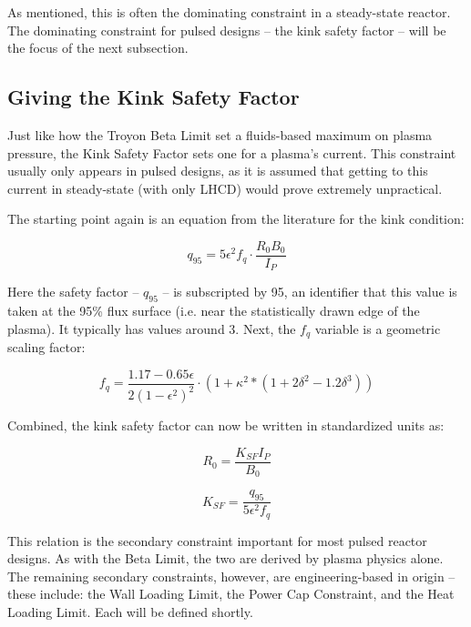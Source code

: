 \documentclass[11pt]{book}
\begin{document}
As mentioned, this is often the dominating constraint in a steady-state reactor. The dominating constraint for pulsed designs -- the kink safety factor -- will be the focus of the next subsection.

\subsection{Giving the Kink Safety Factor}

Just like how the Troyon Beta Limit set a fluids-based maximum on plasma pressure, the Kink Safety Factor sets one for a plasma's current. This constraint usually only appears in pulsed designs, as it is assumed that getting to this current in steady-state (with only LHCD) would prove extremely unpractical.

The starting point again is an equation from the literature for the kink condition:

\begin{equation}
	q_{95} = 5 \epsilon^2 f_q \cdot  \frac{ R_0 B_0 }{ I_P }
\end{equation}

Here the safety factor -- $q_{95}$ -- is subscripted by 95, an identifier that this value is taken at the 95\% flux surface (i.e. near the statistically drawn edge of the plasma). It typically has values around 3. Next, the $f_q$ variable is a geometric scaling factor:

\begin{equation}
  f_q = \frac{1.17 - 0.65 \epsilon}{2 ( 1 - \epsilon^2 )^2} \cdot  \left( 1 + \kappa^2 * ( 1 + 2 \delta^2 - 1.2 \delta^3 ) \right)
\end{equation}

Combined, the kink safety factor can now be written in standardized units as:

\begin{equation}
   R_0 = \frac{ K_{SF} I_P }{ B_0 }
\end{equation}

\begin{equation}
  K_{SF} = \frac{q_{95}}{5 \epsilon^2 f_q}
\end{equation}

This relation is the secondary constraint important for most pulsed reactor designs. As with the Beta Limit, the two are derived by plasma physics alone. The remaining secondary constraints, however, are engineering-based in origin -- these include: the Wall Loading Limit, the Power Cap Constraint, and the Heat Loading Limit. Each will be defined shortly.
\end{document}
